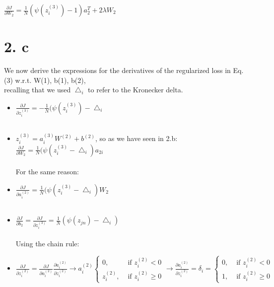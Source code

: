 \documentclass[
	12pt, %
]{fphw}
\begin{document}
$\frac{\partial J}{\partial W_2} = \frac{1}{N} (\psi(z_{i}^{(3)}) - 1) a_{2}^{T} + 2\lambda W_2$


\newpage
\section* {2. c}

We now derive the expressions for the derivatives of the regularized loss in Eq. (3) w.r.t. W(1), b(1), b(2),\\
recalling that we used $\bigtriangleup_i$ to refer to the Kronecker delta. \\

\begin{itemize}

\item $\frac{\partial J}{\partial z_{i}^{(3)}} = - \frac{1}{N} (\psi (z_{i}^{(3)}) - \bigtriangleup_i$ \\ \\

\item $z_{i}^{(3)} = a_{i}^{(3)} W^{(2)} + b^{(2)}$, so as we have seen in 2.b: \\ 

$\frac {\partial J}{\partial W_2} = \frac {1}{N} (\psi (z_{i}^{(3)} - \bigtriangleup_i) a_{2i} $\\ \\

For the same reason:

\item $\frac {\partial J}{\partial a_{i}^{(2)}} = \frac{1}{N} (\psi (z_{i}^{(3)} - \bigtriangleup_i) W_2$ \\	\\

\item $\frac {\partial J}{\partial b_2} = \frac {\partial J}{\partial z_{i}^{(3)}} = \frac{1}{N} (\psi(z_{jn}) - \bigtriangleup_i)$ \\ \\

Using the chain rule:

\item $\frac {\partial J}{\partial z_{i}^{(2)}} = \frac {\partial J}{\partial a_{i}^{(2)}} \frac {\partial a_{i}^{(2)}}{\partial z_{i}^{(2)}} \rightarrow a_{i}^{(2)}\left\{\begin{array}{ll}
0, & \text { if } z_{i}^{(2)}<0 \\
z_{i}^{(2)}, & \text { if } z_{i}^{(2)}\geq0
\end{array}\right.
\rightarrow \frac {\partial a_{i}^{(2)}}{\partial z_{i}^{(2)}} = \delta_i = 
\left\{\begin{array}{ll}
0, & \text { if } z_{i}^{(2)}<0 \\
1, & \text { if } z_{i}^{(2)}\geq0
\end{array}\right.
$ \\


\end{itemize}
\end{document}
